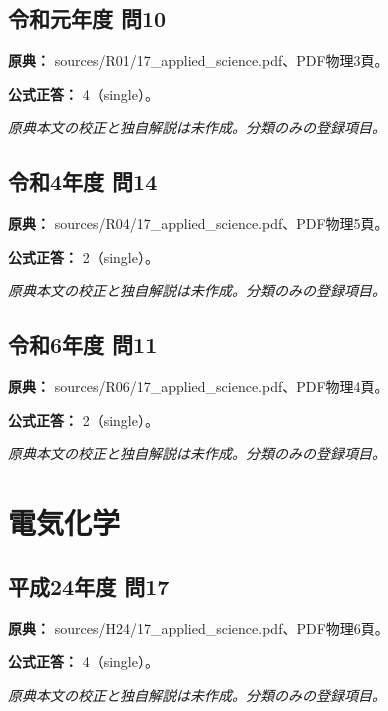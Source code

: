 \subsection{令和元年度 問10}
\label{q:r01-reg-applied-10}

\noindent\textbf{原典：} sources/R01/17\_applied\_science.pdf、PDF物理3頁。

\textbf{公式正答：} 4（single）。

\par\textit{原典本文の校正と独自解説は未作成。分類のみの登録項目。}

\subsection{令和4年度 問14}
\label{q:r04-reg-applied-14}

\noindent\textbf{原典：} sources/R04/17\_applied\_science.pdf、PDF物理5頁。

\textbf{公式正答：} 2（single）。

\par\textit{原典本文の校正と独自解説は未作成。分類のみの登録項目。}

\subsection{令和6年度 問11}
\label{q:r06-reg-applied-11}

\noindent\textbf{原典：} sources/R06/17\_applied\_science.pdf、PDF物理4頁。

\textbf{公式正答：} 2（single）。

\par\textit{原典本文の校正と独自解説は未作成。分類のみの登録項目。}

\section{電気化学}

\subsection{平成24年度 問17}
\label{q:h24-reg-applied-17}

\noindent\textbf{原典：} sources/H24/17\_applied\_science.pdf、PDF物理6頁。

\textbf{公式正答：} 4（single）。

\par\textit{原典本文の校正と独自解説は未作成。分類のみの登録項目。}

